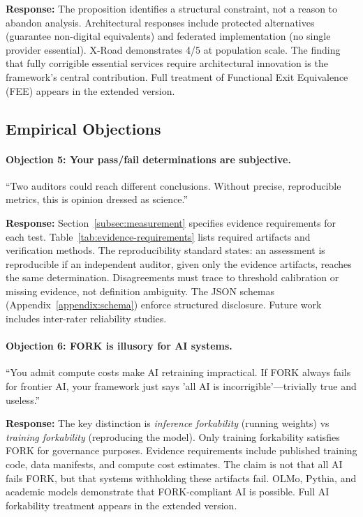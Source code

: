 \textbf{Response:} The proposition identifies a structural constraint, not a reason to abandon analysis. Architectural responses include protected alternatives (guarantee non-digital equivalents) and federated implementation (no single provider essential). X-Road demonstrates 4/5 at population scale. The finding that fully corrigible essential services require architectural innovation is the framework's central contribution. Full treatment of Functional Exit Equivalence (FEE) appears in the extended version.

\subsection{Empirical Objections}

\paragraph{Objection 5: Your pass/fail determinations are subjective.}
``Two auditors could reach different conclusions. Without precise, reproducible metrics, this is opinion dressed as science.''

\textbf{Response:} Section~\ref{subsec:measurement} specifies evidence requirements for each test. Table~\ref{tab:evidence-requirements} lists required artifacts and verification methods. The reproducibility standard states: an assessment is reproducible if an independent auditor, given only the evidence artifacts, reaches the same determination. Disagreements must trace to threshold calibration or missing evidence, not definition ambiguity. The JSON schemas (Appendix~\ref{appendix:schema}) enforce structured disclosure. Future work includes inter-rater reliability studies.

\paragraph{Objection 6: FORK is illusory for AI systems.}
``You admit compute costs make AI retraining impractical. If FORK always fails for frontier AI, your framework just says 'all AI is incorrigible'---trivially true and useless.''

\textbf{Response:} The key distinction is \textit{inference forkability} (running weights) vs \textit{training forkability} (reproducing the model). Only training forkability satisfies FORK for governance purposes. Evidence requirements include published training code, data manifests, and compute cost estimates. The claim is not that all AI fails FORK, but that systems withholding these artifacts fail. OLMo, Pythia, and academic models demonstrate that FORK-compliant AI is possible. Full AI forkability treatment appears in the extended version.

